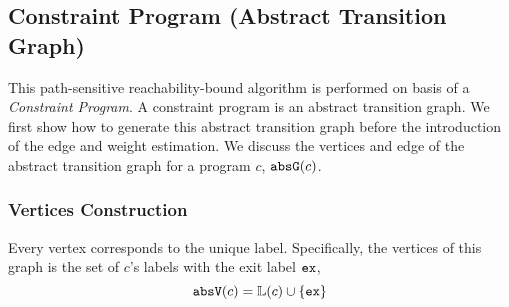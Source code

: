   

\subsection{Constraint Program (Abstract Transition Graph)}
\label{sec:abscfg}

This path-sensitive reachability-bound algorithm
is performed on basis of a \emph{Constraint Program}.
A constraint program is an abstract transition graph.
We first show how to generate this abstract transition graph before the introduction of  the edge and weight estimation.  
We discuss the vertices and edge of the
abstract transition graph for a program $c$, $\mathtt{abs}{\mathtt{G}}(c)$.

\subsubsection{Vertices Construction}
\label{sec:abscfg-vertex}
Every 
vertex corresponds to the unique
label.
Specifically,
the vertices of this graph is the set of $c$'s labels with the exit label ${\mathtt{ex}}$, 
\[ 
  \mathtt{abs}{\mathtt{V}}(c) = \mathbb{L}(c)\cup\{{\mathtt{ex}}\}
  \]

